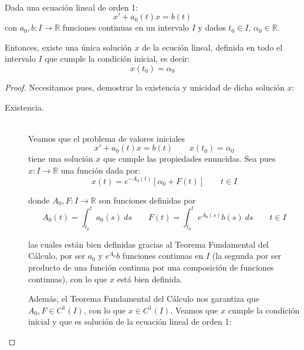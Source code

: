 \begin{prop}
    \ \\
    Dada una ecuación lineal de orden 1:
    \begin{equation*}
        x' + a_0(t)x = b(t)
    \end{equation*}
    con $a_0,b:I\rightarrow\mathbb{R}$ funciones continuas en un intervalo $I$ y dados $t_0\in I$, $\alpha_0\in \mathbb{R}$.

    Entonces, existe una única solución $x$ de la ecución lineal, definida en todo el intervalo $I$ que cumple la condición inicial, es decir:
    \begin{equation*}
        x(t_0) = \alpha_0 
    \end{equation*}
    
    \begin{proof}
        Necesitamos pues, demostrar la existencia y unicidad de dicha solución $x$:
        \begin{description}
            \item [Existencia.]~\\
                Veamos que el problema de valores iniciales
                \begin{equation*}
                    x' + a_0(t)x = b(t) \qquad x(t_0) = \alpha_0
                \end{equation*}
                tiene una solución $x$ que cumple las propiedades enuncidas. Sea pues $x:I\rightarrow\mathbb{R}$ una función dada por:
                \begin{equation*}
                    x(t) = e^{-A_0(t)} [\alpha_0 + F(t)] \qquad t\in I
                \end{equation*}

                donde $A_0,F:I\rightarrow\mathbb{R}$ son funciones definidas por
                \begin{equation*}
                    A_0(t) = \int_{t_0}^{t} a_0(s)~ds \qquad F(t) = \int_{t_0}^{t} e^{A_0(s)}b(s)~ds  \qquad t\in I
                \end{equation*}

                las cuales están bien definidas gracias al Teorema Fundamental del Cálculo, por ser $a_0$ y $e^{A_0}b$ funciones continuas en $I$ (la segunda por ser producto de una función continua por una composición de funciones continuas), con lo que $x$ está bien definida.

                Además, el Teorema Fundamental del Cálculo nos garantiza que $A_0,F\in C^1(I)$, con lo que $x\in C^1(I)$. Veamos que $x$ cumple la condición inicial y que es solución de la ecuación lineal de orden 1:


\end{description}
\end{proof}
\end{prop}
